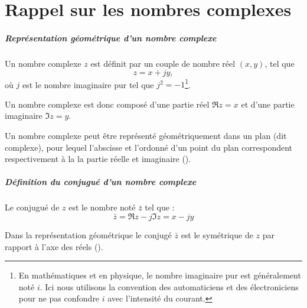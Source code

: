 \chapter{Rappel sur les nombres complexes\label{annexe-NC}}
\paragraph[Représentation d'un nombre complexe]{Représentation géométrique d'un nombre complexe}

Un nombre complexe $z$ est définit par un couple 
de nombre réel $(x,y)$, tel que 
$$
z=x+jy,
$$
où $j$ est le nombre imaginaire pur tel que $j^2=-1$\footnote{En mathématiques et en physique, le nombre 
imaginaire pur est généralement noté $i$. Ici nous utilisons la convention des automaticiens et des électroniciens pour ne
pas confondre $i$ avec l'intensité du courant.}.

Un nombre complexe est donc composé d'une partie 
réel $\Re{z}=x$ et d'une partie imaginaire $\Im{z}=y$.

Un nombre complexe peut être représenté géométriquement dans un plan 
(dit complexe), pour lequel l'abscisse et l'ordonné d'un 
point du plan correspondent respectivement 
à la la partie réelle et imaginaire ().
\paragraph{Définition du conjugué d'un nombre complexe}
Le conjugué de $z$ est le nombre noté $\bar{z}$ tel que :
$$
\bar{z}=\Re{z}-j\Im{z}=x-jy
$$

Dans la représentation géométrique le conjugé $\bar{z}$ est le symétrique de $z$ 
par rapport à l'axe des réels ().


